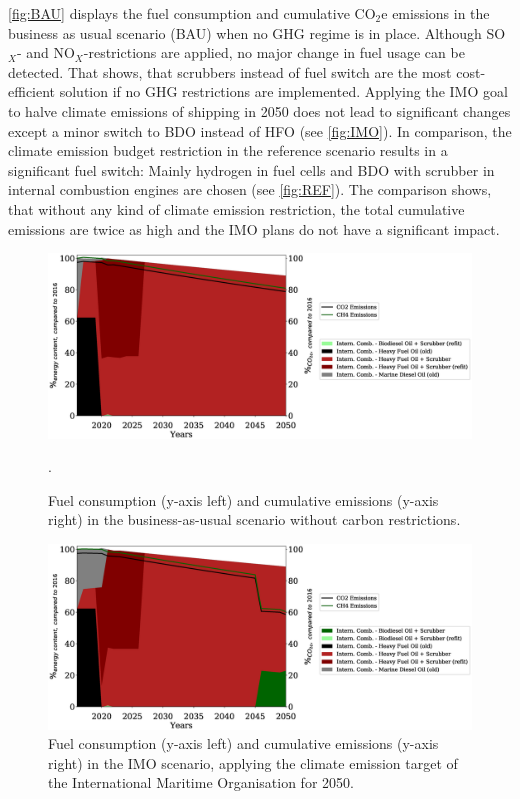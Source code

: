 \documentclass[article]{elsarticle}
\begin{document}
\autoref{fig:BAU} displays the fuel consumption and cumulative CO$_2$e emissions in the business as usual scenario (BAU) when no GHG regime is in place. Although SO$_X$- and NO$_X$-restrictions are applied, no major change in fuel usage can be detected. That shows, that scrubbers instead of fuel switch are the most cost-efficient solution if no GHG restrictions are implemented. Applying the IMO goal to halve climate emissions of shipping in 2050 does not lead to significant changes except a minor switch to BDO instead of HFO (see \autoref{fig:IMO}). In comparison, the climate emission budget restriction in the reference scenario  results in a significant fuel switch: Mainly hydrogen in fuel cells and BDO with scrubber in internal combustion engines are chosen (see \autoref{fig:REF}). The comparison shows, that without any kind of climate emission restriction, the total cumulative emissions are twice as high and the IMO plans do not have a significant impact. 

\begin{figure}
    \centering
    \includegraphics[width=\textwidth]{figures/BAU_fuels_emissions.eps}
    \caption{Fuel consumption (y-axis left) and cumulative emissions (y-axis right) in the business-as-usual scenario without carbon restrictions.}
    \label{fig:BAU}.
\end{figure}

\begin{figure}
    \centering
    \includegraphics[width=\textwidth]{figures/IMO_fuels_emissions.eps}
    \caption{Fuel consumption (y-axis left) and cumulative emissions (y-axis right) in the IMO scenario, applying the climate emission target of the International Maritime Organisation for 2050.}
    \label{fig:IMO}
\end{figure}
\end{document}
